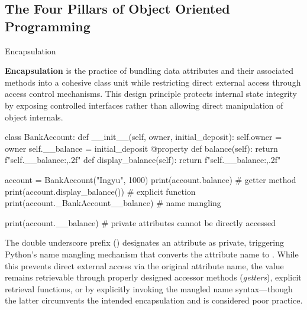 \documentclass[10pt]{article}
\begin{document}
  \subsection{The Four Pillars of Object Oriented Programming}

    \begin{core}[label=core:encapsulation]{Encapsulation}

      \textbf{Encapsulation} is the practice of bundling data attributes and their associated methods into a cohesive class unit while restricting direct external access through access control mechanisms. This design principle protects internal state integrity by exposing controlled interfaces rather than allowing direct manipulation of object internals.
      
      \begin{pyconsole}

        class BankAccount:
            def __init__(self, owner, initial_deposit):
                self.owner = owner
                self.__balance = initial_deposit
            @property
            def balance(self):
                return f"{self.__balance:,.2f}"
            def display_balance(self):
                return f"{self.__balance:,.2f}"

        account = BankAccount("Ingyu", 1000)
        print(account.balance) # getter method
        print(account.display_balance()) # explicit function
        print(account._BankAccount__balance) # name mangling

        print(account.__balance) # private attributes cannot be directly accessed

      \end{pyconsole}
      
      The double underscore prefix () designates an attribute as private, triggering Python's name mangling mechanism that converts the attribute name to . While this prevents direct external access via the original attribute name, the value remains retrievable through properly designed accessor methods (\textit{getters}), explicit retrieval functions, or by explicitly invoking the mangled name syntax---though the latter circumvents the intended encapsulation and is considered poor practice.

    \end{core}
\end{document}
